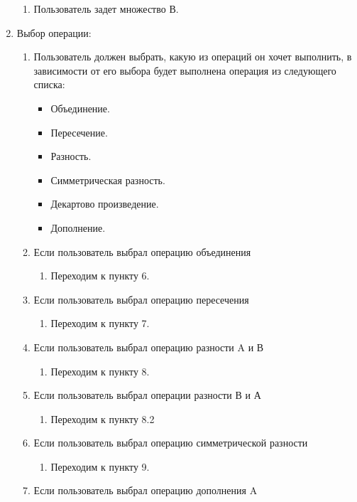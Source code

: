 \documentclass[a4paper,12pt]{extarticle}
\begin{document}
\begin{enumerate}
\begin{enumerate}[label*=\arabic*.]
    \item Пользователь задет множество В.
  \end{enumerate}
  \item Выбор операции:
  \begin{enumerate}[label*=\arabic*.]
    \item Пользователь должен выбрать, какую из операций он хочет выполнить, в зависимости от его выбора будет выполнена операция из следующего списка:
    \begin{itemize}
      \item Объединение.
      \item Пересечение.
      \item Разность.
      \item Симметрическая разность.
      \item Декартово произведение.
      \item Дополнение.
    \end{itemize}
    \item Если пользователь выбрал операцию объединения
    \begin{enumerate}[label*=\arabic*.]
      \item Переходим к пункту 6.
    \end{enumerate}
    \item Если пользователь выбрал операцию пересечения
    \begin{enumerate}[label*=\arabic*.]
      \item Переходим к пункту 7.
    \end{enumerate}
    \item Если пользователь выбрал операцию разности A и В
    \begin{enumerate}[label*=\arabic*.]
      \item Переходим к пункту 8.
    \end{enumerate}
    \item Если пользователь выбрал операции разности В и А
    \begin{enumerate}[label*=\arabic*.]
      \item Переходим к пункту 8.2
    \end{enumerate}
    \item Если пользователь выбрал операцию симметрической разности
    \begin{enumerate}[label*=\arabic*.]
      \item Переходим к пункту 9.
    \end{enumerate}
    \item Если пользователь выбрал операцию дополнения A

\end{enumerate}
\end{enumerate}
\end{document}
